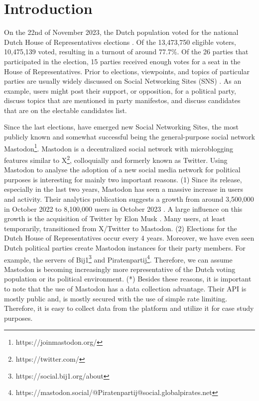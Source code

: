 \section{Introduction}
On the 22nd of November 2023, the Dutch population voted for the national Dutch House of Representatives elections \cite{kies}.
Of the 13,473,750 eligible voters, 10,475,139 voted, resulting in a turnout of around 77.7\%.
Of the 26 parties that participated in the election, 15 parties received enough votes for a seat in the House of Representatives.
Prior to elections, viewpoints, and topics of particular parties are usually widely discussed on Social Networking Sites (SNS) \cite{functions}.
As an example, users might post their support, or opposition, for a political party, discuss topics that are mentioned in party manifestos, and discuss candidates that are on the electable candidates list.

Since the last elections, have emerged new Social Networking Sites, the most publicly known and somewhat successful being the general-purpose social network \cite{characteristics} Mastodon\footnote{https://joinmastodon.org/}. Mastodon is a decentralized social network with microblogging features similar to X\footnote{https://twitter.com/}, colloquially and formerly known as Twitter.
Using Mastodon to analyse the adoption of a new social media network for political purposes is interesting for mainly two important reasons. 
(1) Since its release, especially in the last two years, Mastodon has seen a massive increase in users and activity.
Their analytics publication suggests a growth from around 3,500,000 in October 2022 to 8,100,000 users in October 2023 \cite{analytics}.
A large influence on this growth is the acquisition of Twitter by Elon Musk \cite{musk}.
Many users, at least temporarily, transitioned from X/Twitter to Mastodon.
(2) Elections for the Dutch House of Representatives occur every 4 years.
Moreover, we have even seen Dutch political parties create Mastodon instances for their party members.
For example, the servers of Bij1\footnote{https://social.bij1.org/about} and Piratenpartij\footnote{https://mastodon.social/@Piratenpartij@social.globalpirates.net}.
Therefore, we can assume Mastodon is becoming increasingly more representative of the Dutch voting population or its political environment.
(*) Besides these reasons, it is important to note that the use of Mastodon has a data collection advantage.
Their API is mostly public and, is mostly secured with the use of simple rate limiting.
Therefore, it is easy to collect data from the platform and utilize it for case study purposes.

